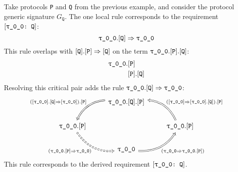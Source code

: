 \documentclass[../generics]{subfiles}
\begin{document}
\begin{example}
Take protocols \texttt{P} and \texttt{Q} from the previous example, and consider the protocol generic signature $G_\texttt{Q}$. The one local rule corresponds to the requirement $[\texttt{\texttt{$\uptau$\_0\_0}:~Q}]$:
\[\texttt{$\uptau$\_0\_0}.[\texttt{Q}]\Rightarrow\texttt{$\uptau$\_0\_0}\]
This rule overlaps with $[\texttt{Q}].[\texttt{P}]\Rightarrow[\texttt{Q}]$ on the term $\texttt{$\uptau$\_0\_0}.[\texttt{P}].[\texttt{Q}]$:
\begin{align*}
\texttt{$\uptau$\_0\_0}.&[\texttt{P}]\\
&[\texttt{P}].[\texttt{Q}]
\end{align*}
Resolving this critical pair adds the rule $\texttt{$\uptau$\_0\_0}.[\texttt{Q}]\Rightarrow\texttt{$\uptau$\_0\_0}$:
\[
\FourLoopDerived%
{\ttgp{0}{0}.\protosym{Q}.\protosym{P}}%
{\ttgp{0}{0}.\protosym{P}}%
{\ttgp{0}{0}}%
{\ttgp{0}{0}.\protosym{P}}%
{(\ProtoInherit{\ttgp{0}{0}}{Q}).\protosym{P}}%
{(\ProtoConf{\ttgp{0}{0}}{P})}%
{(\ProtoConfInv{\ttgp{0}{0}}{P})}%
{(\ProtoInheritInv{\ttgp{0}{0}}{Q}).\protosym{P}}
\]
This rule corresponds to the derived requirement $[\texttt{\texttt{$\uptau$\_0\_0}:~Q}]$.
\end{example}
\end{document}
